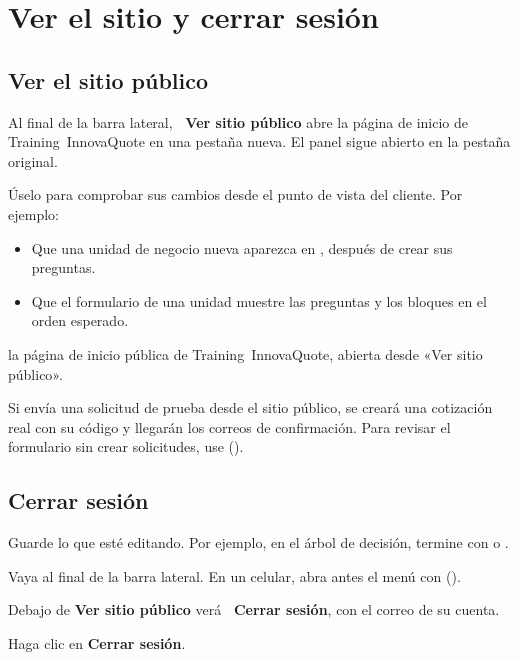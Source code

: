 \chapter{Ver el sitio y cerrar sesión}\label{cap:salida}


\section{Ver el sitio público}\label{sec:sitio-publico}

Al final de la barra lateral, \textbf{\icExterno\ Ver sitio público} abre la página de inicio de Training~InnovaQuote en una pestaña nueva. El panel sigue abierto en la pestaña original.

Úselo para comprobar sus cambios desde el punto de vista del cliente. Por ejemplo:

\begin{itemize}
  \item Que una unidad de negocio nueva aparezca en , después de
        crear sus preguntas.
  \item Que el formulario de una unidad muestre las preguntas y los bloques en el orden
        esperado.
\end{itemize}

  {la página de inicio pública de Training~InnovaQuote, abierta desde «Ver sitio público».}

\begin{importante}
Si envía una solicitud de prueba desde el sitio público, se creará una cotización real con su
código y llegarán los correos de confirmación. Para revisar el formulario sin crear solicitudes,
use  ().
\end{importante}

\section{Cerrar sesión}\label{sec:cerrar-sesion}

\begin{pasos}
  \item Guarde lo que esté editando. Por ejemplo, en el árbol de decisión, termine con
         o .
  \item Vaya al final de la barra lateral. En un celular, abra antes el menú con
        \textbf{\icMenu} ().
  \item Debajo de \textbf{Ver sitio público} verá \textbf{\icSalir\ Cerrar sesión}, con el
        correo de su cuenta.
  \item Haga clic en \textbf{Cerrar sesión}.
\end{pasos}

